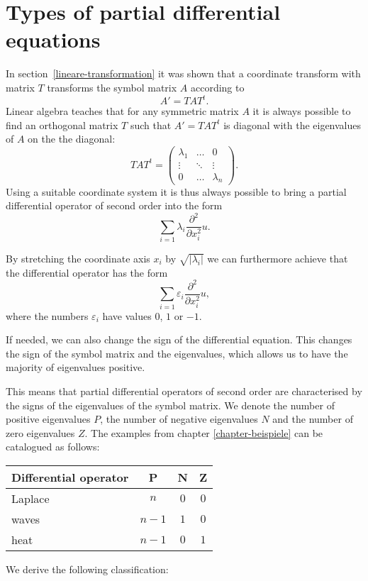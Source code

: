 %
%
%
\section{Types of partial differential equations}
In section~\ref{lineare-transformation}
it was shown that a coordinate transform with matrix $T$ transforms
the symbol matrix $A$ according to
\[
A'=TAT^t .
\]
Linear algebra teaches that for any symmetric matrix $A$ it is always possible 
to find an orthogonal matrix $T$ such that $A'=TAT^t$ is diagonal with
the eigenvalues of $A$ on the the diagonal:
\[
TAT^t
=
\begin{pmatrix}\lambda_1&\dots&0\\
\vdots&\ddots&\vdots\\
0&\dots&\lambda_n
\end{pmatrix}.
\]
Using a suitable coordinate system it is thus always possible to 
bring a partial differential operator of second order into the form
\[
\sum_{i=1}\lambda_i\frac{\partial^2}{\partial x_i^2}u.
\]

By stretching the coordinate axis $x_i$ by 
$\sqrt{|\lambda_i|}$
we can furthermore achieve that the differential operator
has the form
\[
\sum_{i=1}\varepsilon_i\frac{\partial^2}{\partial x_i^2}u,
\]
where the numbers $\varepsilon_i$ have values $0$, $1$ or $-1$.

If needed, we can also change the sign of the differential equation.
This changes the sign of the symbol matrix and the eigenvalues, which
allows us to have the majority of eigenvalues positive.

This means that partial differential operators of second order are
characterised by the signs of the eigenvalues of the symbol matrix.
We denote the number of positive eigenvalues $P$, the number of negative
eigenvalues $N$ and the number of zero eigenvalues $Z$.
The examples from chapter \ref{chapter-beispiele}
can be catalogued as follows:
\begin{center}
\begin{tabular}{l|ccc}
Differential operator&P&N&Z
\\
\hline
Laplace&
$n$&$0$&$0$
\\
waves&
$n-1$&$1$&$0$
\\
heat&
$n-1$&$0$&$1$
\end{tabular}
\end{center}
We derive the following classification:

